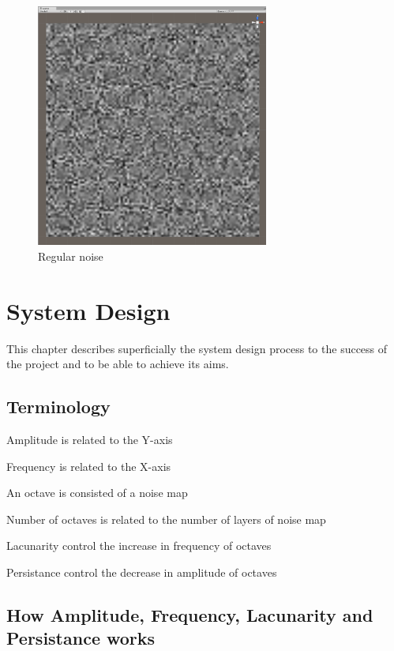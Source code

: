 \documentclass[a4paper,12pt]{book}
\begin{document}
\begin{figure}
\begin{center}
\includegraphics[height=80mm]{Map_Noise_Example.png}
\end{center}
\caption{Regular noise}
\label{fig:pretty}
\end{figure}


\chapter{System Design}
\label{chap:systemDesign}

This chapter describes superficially the system design process to the success of the project and to be able to achieve its aims.

\section{Terminology}


Amplitude is related to the Y-axis

Frequency is related to the X-axis

An octave is consisted of a noise map

Number of octaves is related to the number of layers of noise map

Lacunarity control the increase in frequency of octaves

Persistance control the decrease in amplitude of octaves



\section{How Amplitude, Frequency, Lacunarity and Persistance works}
\end{document}
